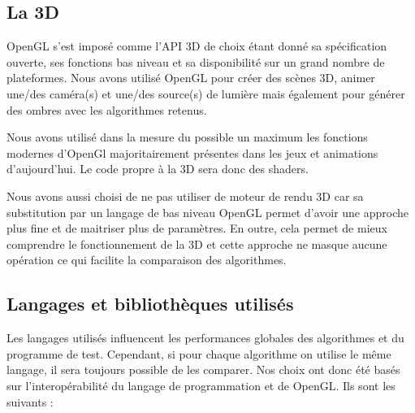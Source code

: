 \documentclass[a4paper,12pt]{report}
\begin{document}
\subsection{La 3D}

OpenGL s'est imposé comme l'API 3D de choix étant donné sa spécification ouverte, ses fonctions bas niveau et sa disponibilité sur un grand nombre de plateformes.
Nous avons utilisé OpenGL pour créer des scènes 3D, animer une/des caméra(s) et une/des source(s) de lumière mais également pour générer des ombres avec les algorithmes retenus.

Nous avons utilisé dans la mesure du possible un maximum les fonctions modernes d'OpenGl majoritairement présentes dans les jeux et animations d'aujourd'hui. Le code propre à la 3D sera donc des shaders.

Nous avons aussi choisi de ne pas utiliser de moteur de rendu 3D car sa substitution par un langage de bas niveau OpenGL permet d'avoir une approche plus fine et de maitriser plus de paramètres. En outre, cela permet de mieux comprendre le fonctionnement de la 3D et cette approche ne masque aucune opération ce qui facilite la comparaison des algorithmes.

\subsection{Langages et bibliothèques utilisés}

Les langages utilisés influencent les performances globales des algorithmes et du programme de test. Cependant, si pour chaque algorithme on utilise le m\^eme langage, il sera toujours possible de les comparer. Nos choix ont donc été basés sur l'interopérabilité du langage de programmation et de OpenGL. Ils sont les suivants :
\end{document}
